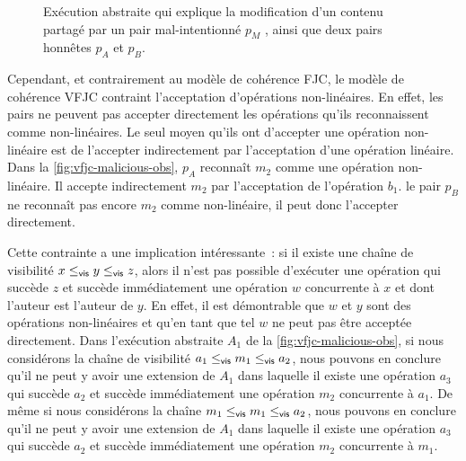 \begin{figure}[htb]
\centering
{}
\caption[Opérations non-linéaires]{Exécution abstraite qui explique la modification d'un contenu partagé par un pair mal-intentionné $p_M$ , ainsi que deux pairs honnêtes $p_A$ et $p_B$.}
\label{fig:vfjc-malicious-obs}
\end{figure}

Cependant, et contrairement au modèle de cohérence \acl{FJC}, le modèle de cohérence \acl{VFJC} contraint l'acceptation d'opérations non-linéaires.
En effet, les pairs ne peuvent pas accepter directement les opérations qu'ils reconnaissent comme non-linéaires.
Le seul moyen qu'ils ont d'accepter une opération non-linéaire est de l'accepter indirectement par l'acceptation d'une opération linéaire.
Dans la \autoref{fig:vfjc-malicious-obs}, $p_A$ reconnaît $m_2$ comme une opération non-linéaire.
Il accepte indirectement $m_2$ par l'acceptation de l'opération $b_1$.
le pair $p_B$ ne reconnaît pas encore $m_2$ comme non-linéaire, il peut donc l'accepter directement.

Cette contrainte a une implication intéressante~: si il existe une chaîne de visibilité $x \leq_{\operatorname{\mathsf{vis}}} y \leq_{\operatorname{\mathsf{vis}}} z$, alors il n'est pas possible d'exécuter une opération qui succède $z$ et succède immédiatement une opération $w$ concurrente à $x$ et dont l'auteur est l'auteur de $y$.
En effet, il est démontrable que $w$ et $y$ sont des opérations non-linéaires et qu'en tant que tel $w$ ne peut pas être acceptée directement.
Dans l'exécution abstraite $A_1$ de la \autoref{fig:vfjc-malicious-obs}, si nous considérons la chaîne de visibilité $a_1 \leq_{\operatorname{\mathsf{vis}}} m_1 \leq_{\operatorname{\mathsf{vis}}} a_2$, nous pouvons en conclure qu'il ne peut y avoir une extension de $A_1$ dans laquelle il existe une opération $a_3$ qui succède $a_2$ et succède immédiatement une opération $m_2$ concurrente à $a_1$.
De même si nous considérons la chaîne $m_1 \leq_{\operatorname{\mathsf{vis}}} m_1 \leq_{\operatorname{\mathsf{vis}}} a_2$, nous pouvons en conclure qu'il ne peut y avoir une extension de $A_1$ dans laquelle il existe une opération $a_3$ qui succède $a_2$ et succède immédiatement une opération $m_2$ concurrente à $m_1$.

